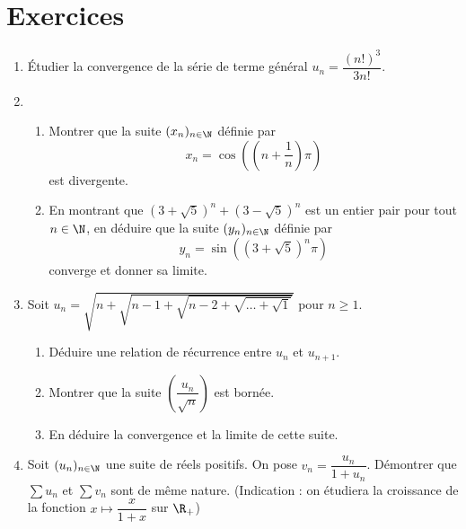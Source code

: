 \documentclass{article}
\begin{document}
\section{Exercices}
\begin{enumerate}
\item Étudier la convergence de la série de terme général $u_n = \dfrac{(n!)^3}{3n!}$.
\item 
\begin{enumerate}[label=\emph{\alph*)}]
\item Montrer que la suite $(x_n)_{n \in \N}$ définie par
\begin{equation*}
x_n = \cos\left(\left(n + \dfrac{1}{n}\right)\pi\right)
\end{equation*}
est divergente.
\item En montrant que $\left(3 + \sqrt{5}\right)^n + \left(3 - \sqrt{5}\right)^n$ est un entier pair pour tout $n \in \N$, en déduire que la suite $(y_n)_{n \in \N}$ définie par
\begin{equation*}
y_n = \sin\left(\left(3 + \sqrt{5}\right)^n \pi \right)
\end{equation*}
converge et donner sa limite.
\end{enumerate}
\item Soit $u_n = \sqrt{n + \sqrt{n - 1 + \sqrt{n - 2 + \sqrt{\dots + \sqrt{1}}}}}$ pour $n \geq 1$.
\begin{enumerate}[label=\emph{\alph*)}]
\item Déduire une relation de récurrence entre $u_n$ et $u_{n+1}$.
\item Montrer que la suite $\left(\dfrac{u_n}{\sqrt{n}}\right)$ est bornée.
\item En déduire la convergence et la limite de cette suite. 
\end{enumerate}
\item Soit $(u_n)_{n \in \N}$ une suite de réels positifs. On pose $v_n = \dfrac{u_n}{1 + u_n}$. Démontrer que $\sum u_n$ et $\sum v_n$ sont de même nature. (Indication : on étudiera la croissance de la fonction $x \mapsto \dfrac{x}{1+x}$ sur $\R_+$)
\end{enumerate}
\end{document}

